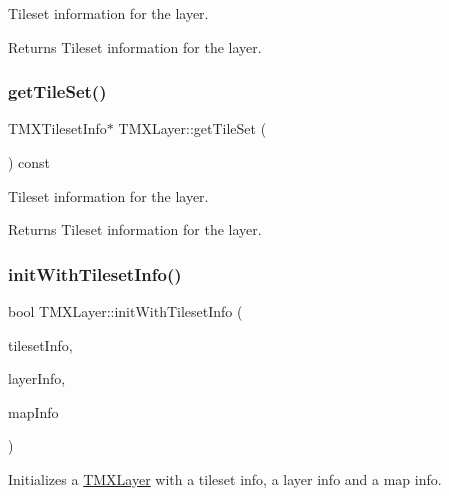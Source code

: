 Tileset information for the layer.

\begin{DoxyReturn}{Returns}
Tileset information for the layer. 
\end{DoxyReturn}
\mbox{\label{classTMXLayer_a2f1133ee7af2fa00682c68b5bca6541b}} 
\subsubsection{\texorpdfstring{get\+Tile\+Set()}{getTileSet()}\hspace{0.1cm}{\footnotesize\ttfamily [2/2]}}
{\footnotesize\ttfamily T\+M\+X\+Tileset\+Info$\ast$ T\+M\+X\+Layer\+::get\+Tile\+Set (\begin{DoxyParamCaption}{ }\end{DoxyParamCaption}) const\hspace{0.3cm}{\ttfamily [inline]}}

Tileset information for the layer.

\begin{DoxyReturn}{Returns}
Tileset information for the layer. 
\end{DoxyReturn}
\mbox{\label{classTMXLayer_abc5373b13dff0e9f01697f46783eaff8}} 
\subsubsection{\texorpdfstring{init\+With\+Tileset\+Info()}{initWithTilesetInfo()}\hspace{0.1cm}{\footnotesize\ttfamily [1/2]}}
{\footnotesize\ttfamily bool T\+M\+X\+Layer\+::init\+With\+Tileset\+Info (\begin{DoxyParamCaption}\item[{T\+M\+X\+Tileset\+Info $\ast$}]{tileset\+Info,  }\item[{T\+M\+X\+Layer\+Info $\ast$}]{layer\+Info,  }\item[{T\+M\+X\+Map\+Info $\ast$}]{map\+Info }\end{DoxyParamCaption})}

Initializes a \hyperlink{classTMXLayer}{T\+M\+X\+Layer} with a tileset info, a layer info and a map info.


